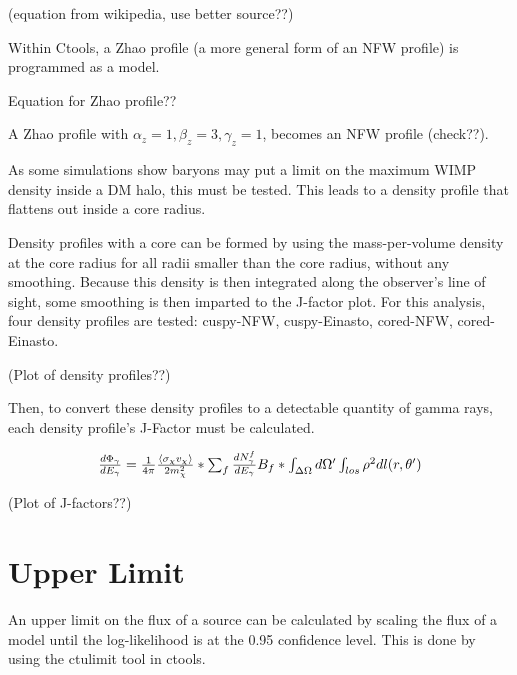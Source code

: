   (equation from wikipedia, use better source??)

  Within Ctools, a Zhao profile (a more general form of an NFW profile) is programmed as a model.

  Equation for Zhao profile??

  A Zhao profile with $ \alpha_{z} = 1 , \beta_{z} = 3 , \gamma_{z} = 1 $, becomes an NFW profile (check??).

  As some simulations show baryons may put a limit on the maximum WIMP density inside a DM halo, this must be tested.
  This leads to a density profile that flattens out inside a core radius.

  Density profiles with a core can be formed by using the mass-per-volume density at the core radius for all radii smaller than the core radius, without any smoothing.
  Because this density is then integrated along the observer's line of sight, some smoothing is then imparted to the J-factor plot.
  For this analysis, four density profiles are tested: cuspy-NFW, cuspy-Einasto, cored-NFW, cored-Einasto.

  (Plot of density profiles??)


  Then, to convert these density profiles to a detectable quantity of gamma rays, each density profile's J-Factor must be calculated.


  \begin{equation} \label{eqn:jfactor}
  $$ \frac{d \Phi_{\gamma}}{d E_{\gamma}} = \frac{1}{4\pi} \frac{ \langle \sigma_{\chi} v_{\chi} \rangle }{2 m^{2}_{\chi}} * \sum_{f} \frac{ d N_{\gamma}^{f} }{d E_{\gamma} } B_{f} * \int_{ \Delta \Omega } d \Omega' \int_{los} \rho^{2} d l( r, \theta' )  $$
  \end{equation}


  (Plot of J-factors??)

  
\section{Upper Limit}
  An upper limit on the flux of a source can be calculated by scaling the flux of a model until the log-likelihood is at the 0.95 confidence level.
  This is done by using the ctulimit tool in ctools.
  
